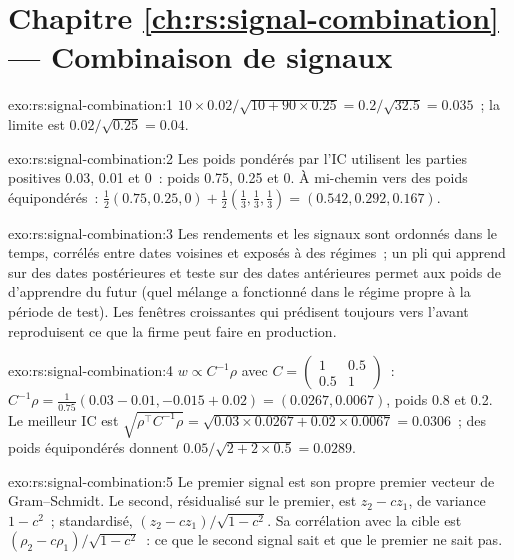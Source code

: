 \section*{Chapitre \ref{ch:rs:signal-combination} --- Combinaison de signaux}

\begin{solution}{exo:rs:signal-combination:1}
$10 \times 0.02/\sqrt{10 + 90 \times 0.25} = 0.2/\sqrt{32.5} = 0.035$~; la limite est $0.02/\sqrt{0.25} = 0.04$.
\end{solution}

\begin{solution}{exo:rs:signal-combination:2}
Les poids pondérés par l'IC utilisent les parties positives 0.03, 0.01 et 0~: poids 0.75, 0.25 et 0. À mi-chemin vers des poids équipondérés~:
$\frac12(0.75, 0.25, 0) + \frac12(\frac13, \frac13, \frac13) = (0.542, 0.292, 0.167)$.
\end{solution}

\begin{solution}{exo:rs:signal-combination:3}
Les rendements et les signaux sont ordonnés dans le temps, corrélés entre dates voisines et exposés à des régimes~; un pli qui apprend sur des dates postérieures et teste sur
des dates antérieures permet aux poids de  d'apprendre du futur (quel mélange a fonctionné dans le régime propre à la période de test). Les fenêtres croissantes qui prédisent toujours
vers l'avant reproduisent ce que la firme peut faire en production.
\end{solution}

\begin{solution}{exo:rs:signal-combination:4}
$w \propto C^{-1}\rho$ avec $C = \begin{pmatrix} 1 & 0.5\\ 0.5 & 1\end{pmatrix}$~: $C^{-1}\rho = \frac{1}{0.75}(0.03 - 0.01, -0.015 + 0.02) = (0.0267, 0.0067)$,
poids 0.8 et 0.2. Le meilleur IC est $\sqrt{\rho^\top C^{-1}\rho} = \sqrt{0.03 \times 0.0267 + 0.02 \times 0.0067} = 0.0306$~; des poids équipondérés donnent
$0.05/\sqrt{2 + 2 \times 0.5} = 0.0289$.
\end{solution}

\begin{solution}{exo:rs:signal-combination:5}
Le premier signal est son propre premier vecteur de Gram--Schmidt. Le second, résidualisé sur le premier, est $z_2 - cz_1$, de variance $1 - c^2$~; standardisé,
$(z_2 - cz_1)/\sqrt{1 - c^2}$. Sa corrélation avec la cible est $(\rho_2 - c\rho_1)/\sqrt{1 - c^2}$~: ce que le second signal sait et que le premier
ne sait pas.
\end{solution}

